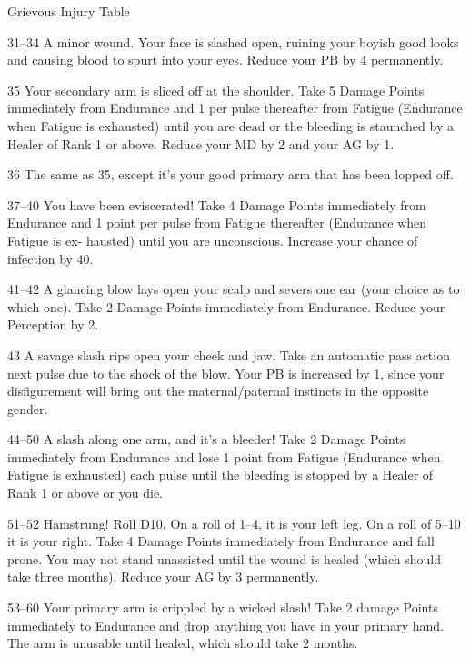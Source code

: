 \begin{Chapter}{Grievous Injury Table}
\begin{Description}
\item[31–34] A minor wound. Your face is slashed open, ruining your
  boyish good looks and causing blood to spurt into your eyes.  Reduce
  your PB by 4 permanently.

\item[35] Your secondary arm is sliced off at the shoulder. Take 5
  Damage Points immediately from Endurance and 1 per pulse thereafter
  from Fatigue (Endurance when Fatigue is exhausted) until you are
  dead or the bleeding is staunched by a Healer of Rank 1 or
  above. Reduce your MD by 2 and your AG by 1.

\item[36] The same as 35, except it’s your good primary arm that has
  been lopped off.

\item[37–40] You have been eviscerated! Take 4 Damage Points
  immediately from Endurance and 1 point per pulse from Fatigue
  thereafter (Endurance when Fatigue is ex- hausted) until you are
  unconscious. Increase your chance of infection by 40.

\item[41–42] A glancing blow lays open your scalp and severs one ear
  (your choice as to which one). Take 2 Damage Points immediately from
  Endurance. Reduce your Perception by 2.

\item[43] A savage slash rips open your cheek and jaw. Take an
  automatic pass action next pulse due to the shock of the blow. Your
  PB is increased by 1, since your disfigurement will bring out the
  maternal/paternal instincts in the opposite gender.

\item[44–50] A slash along one arm, and it’s a bleeder!  Take 2 Damage
  Points immediately from Endurance and lose 1 point from Fatigue
  (Endurance when Fatigue is exhausted) each pulse until the bleeding
  is stopped by a Healer of Rank 1 or above or you die.

\item[51–52] Hamstrung! Roll D10. On a roll of 1–4, it is your left
  leg. On a roll of 5–10 it is your right. Take 4 Damage Points
  immediately from Endurance and fall prone. You may not stand
  unassisted until the wound is healed (which should take three
  months).  Reduce your AG by 3 permanently.

\item[53–60] Your primary arm is crippled by a wicked slash! Take 2
  damage Points immediately to Endurance and drop anything you have in
  your primary hand. The arm is unusable until healed, which should
  take 2 months.


\end{Description}
\end{Chapter}
